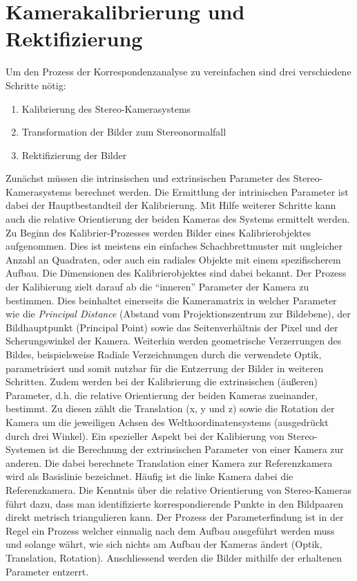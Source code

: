 \section{Kamerakalibrierung und Rektifizierung}
\label{sec:camera_calibration}
Um den Prozess der Korrespondenzanalyse zu vereinfachen sind drei verschiedene Schritte nötig:
\begin{enumerate}
	\item Kalibrierung des Stereo-Kamerasystems
	\item Transformation der Bilder zum Stereonormalfall
	\item Rektifizierung der Bilder
\end{enumerate}
 Zunächst müssen die intrinsischen und extrinsischen Parameter des Stereo-Kamerasystems berechnet werden. Die Ermittlung der intrinischen Parameter ist dabei der Hauptbestandteil der Kalibrierung. Mit Hilfe weiterer Schritte kann auch die relative Orientierung der beiden Kameras des Systems ermittelt werden. Zu Beginn des Kalibrier-Prozesses werden Bilder eines Kalibrierobjektes aufgenommen. Dies ist meistens ein einfaches Schachbrettmuster mit ungleicher Anzahl an Quadraten, oder auch ein radiales Objekte mit einem spezifischerem Aufbau. Die Dimensionen des Kalibrierobjektes sind dabei bekannt. Der Prozess der Kalibierung zielt darauf ab die \enquote{inneren} Parameter der Kamera zu bestimmen. Dies beinhaltet einerseits die Kameramatrix in welcher Parameter wie die \emph{Principal Distance} (Abstand vom Projektionszentrum zur Bildebene), der Bildhauptpunkt (Principal Point) sowie das Seitenverhältnis der Pixel und der Scherungswinkel der Kamera. Weiterhin werden geometrische Verzerrungen des Bildes, beispielsweise Radiale Verzeichnungen durch die verwendete Optik, parametrisiert und somit nutzbar für die Entzerrung der Bilder in weiteren Schritten. Zudem werden bei der Kalibrierung die extrinsischen (äußeren) Parameter, d.h. die relative Orientierung der beiden Kameras zueinander, bestimmt. Zu diesen zählt die Translation (x, y und z) sowie die Rotation der Kamera um die jeweiligen Achsen des Weltkoordinatensystems (ausgedrückt durch drei Winkel). Ein spezieller Aspekt bei der Kalibierung von Stereo-Systemen ist die Berechnung der extrinsischen Parameter von einer Kamera zur anderen. Die dabei berechnete Translation einer Kamera zur Referenzkamera wird als Basislinie bezeichnet. Häufig ist die linke Kamera dabei die Referenzkamera. Die Kenntnis über die relative Orientierung von Stereo-Kameras führt dazu, dass man identifizierte korrespondierende Punkte in den Bildpaaren direkt metrisch triangulieren kann. Der Prozess der Parameterfindung ist in der Regel ein Prozess welcher einmalig nach dem Aufbau ausgeführt werden muss und solange währt, wie sich nichts am Aufbau der Kameras ändert (Optik, Translation, Rotation). Anschliessend werden die Bilder mithilfe der erhaltenen Parameter entzerrt.\\

